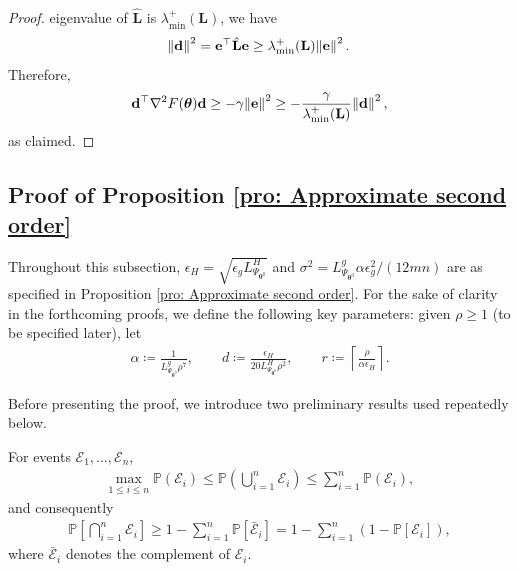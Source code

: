\documentclass{siamart251216}
\begin{document}
\begin{proof}
    eigenvalue of $\hat{\mathbf{L}}$ is
    $\lambda_{\min}^{+}(\mathbf{L})$, we have
    \begin{gather*}
        \norm{\mathbf{d}}^{2}
        =
        \mathbf{e}^{\top}
        \hat{\mathbf{L}}
        \mathbf{e}
        \ge
        \lambda_{\min}^{+}(\mathbf{L})
        \norm{\mathbf{e}}^{2}.
    \end{gather*}
    Therefore,
    \begin{gather*}
        \mathbf{d}^{\top}
        \nabla^{2}F(\boldsymbol{\theta})
        \mathbf{d}
        \ge
        -\gamma\norm{\mathbf{e}}^{2} \ge
        -
        \frac{\gamma}
        {\lambda_{\min}^{+}(\mathbf{L})}
        \norm{\mathbf{d}}^{2},
    \end{gather*}
    as claimed.
\end{proof}

\begin{figure}[omitted: a diagram of this paper's results, not reproduced here]\label{fig: Proof structure}\end{figure}

\subsection{Proof of Proposition \ref{pro: Approximate second order}}
Throughout this subsection, $\epsilon_H=\sqrt{\epsilon_gL_{\Psi_{\boldsymbol{\theta}^{0}}}^{H}}$ and $\sigma^{2}=L_{\Psi_{\boldsymbol{\theta}^{0}}}^{g}\alpha\epsilon_g^{2}/(12mn)$ are as specified in Proposition \ref{pro: Approximate second order}.
For the sake of clarity in the forthcoming proofs, we define the following key parameters: given $\rho \ge 1$ (to be specified later), let 
\begin{gather}
    \label{eq: parameters}
    \alpha\coloneqq\frac{1}{L_{\Psi_{\boldsymbol{\theta}^{0}}}^{g}\rho^{7}},
    \qquad
    d\coloneqq\frac{\epsilon_H}{20L_{\Psi_{\boldsymbol{\theta}^{0}}}^{H}\rho^{2}},
    \qquad
    r\coloneqq\left\lceil\frac{\rho}{\alpha\epsilon_H}\right\rceil .
\end{gather}

Before presenting the proof, we introduce two preliminary results used repeatedly below.

\begin{proposition}
\label{pro: Boole-frechet Inequality}
    For events $\mathcal{E}_1,\ldots,\mathcal{E}_n$,
    \begin{gather*}
        \max_{1\leq i\leq n}\mathbb{P}(\mathcal{E}_i)\leq\mathbb{P}\left(\bigcup_{i=1}^{n}\mathcal{E}_i\right)\leq\sum_{i=1}^{n}\mathbb{P}(\mathcal{E}_i),
    \end{gather*}
    and consequently
    \begin{gather}
    \label{eq: Boole's inequality}
        \mathbb{P}\left[\bigcap_{i=1}^{n}\mathcal{E}_i\right]\geq1-\sum_{i=1}^{n}\mathbb{P}[\bar{\mathcal{E}}_i]=1-\sum_{i=1}^{n}\left(1-\mathbb{P}[\mathcal{E}_i]\right),
    \end{gather}
    where $\bar{\mathcal{E}}_i$ denotes the complement of $\mathcal{E}_i$.
\end{proposition}
\end{document}
